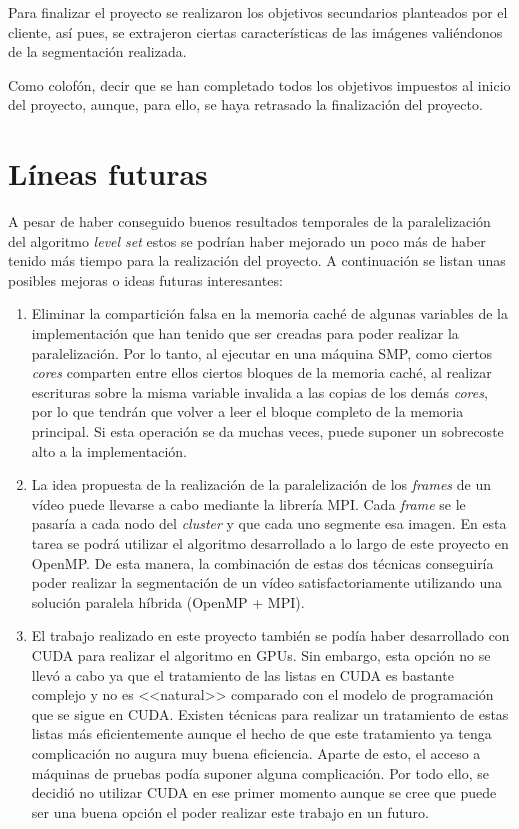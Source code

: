 Para finalizar el proyecto se realizaron los objetivos secundarios planteados por el cliente, as\'{i} pues, se extrajeron ciertas caracter\'{i}sticas de las im\'{a}genes vali\'{e}ndonos de la segmentaci\'{o}n realizada.

 Como colof\'{o}n, decir que se han completado todos los objetivos impuestos al inicio del proyecto, aunque, para ello, se haya retrasado la finalizaci\'{o}n del proyecto.



\section{L\'{i}neas futuras}\label{propuestaDeMejora}

A pesar de haber conseguido buenos resultados temporales de la paralelizaci\'{o}n del algoritmo \textit{level set} estos se podr\'{i}an haber mejorado un poco m\'{a}s de haber tenido m\'{a}s tiempo para la realizaci\'{o}n del proyecto. A continuaci\'{o}n se listan unas posibles mejoras o ideas futuras interesantes:

\begin{enumerate}
	\item Eliminar la compartici\'{o}n falsa en la memoria cach\'{e} de algunas variables de la implementaci\'{o}n que han tenido que ser creadas para poder realizar la paralelizaci\'{o}n. Por lo tanto, al ejecutar en una m\'{a}quina SMP, como ciertos \textit{cores} comparten entre ellos ciertos bloques de la memoria cach\'{e}, al realizar escrituras sobre la misma variable invalida a las copias de los dem\'{a}s \textit{cores}, por lo que tendr\'{a}n que volver a leer el bloque completo de la memoria principal. Si esta operaci\'{o}n se da muchas veces, puede suponer un sobrecoste alto a la implementaci\'{o}n.
	\item La idea propuesta de la realizaci\'{o}n de la paralelizaci\'{o}n de los \textit{frames} de un v\'{i}deo puede llevarse a cabo mediante la librer\'{i}a MPI. Cada \textit{frame} se le pasar\'{i}a a cada nodo del \textit{cluster} y que cada uno segmente esa imagen. En esta tarea se podr\'{a} utilizar el algoritmo desarrollado a lo largo de este proyecto en OpenMP. De esta manera, la combinaci\'{o}n de estas dos t\'{e}cnicas conseguir\'{i}a poder realizar la segmentaci\'{o}n de un v\'{i}deo satisfactoriamente utilizando una soluci\'{o}n paralela h\'{i}brida (OpenMP + MPI).
	\item El trabajo realizado en este proyecto tambi\'{e}n se pod\'{i}a haber desarrollado con CUDA para realizar el algoritmo en GPUs. Sin embargo, esta opci\'{o}n no se llev\'{o} a cabo ya que el tratamiento de las listas en CUDA es bastante complejo y no es <<natural>> comparado con el modelo de programaci\'{o}n que se sigue en CUDA. Existen t\'{e}cnicas para realizar un tratamiento de estas listas m\'{a}s eficientemente aunque el hecho de que este tratamiento ya tenga complicaci\'{o}n no augura muy buena eficiencia. Aparte de esto, el acceso a m\'{a}quinas de pruebas pod\'{i}a suponer alguna complicaci\'{o}n. Por todo ello, se decidi\'{o} no utilizar CUDA en ese primer momento aunque se cree que puede ser una buena opci\'{o}n el poder realizar este trabajo en un futuro. 
\end{enumerate}
